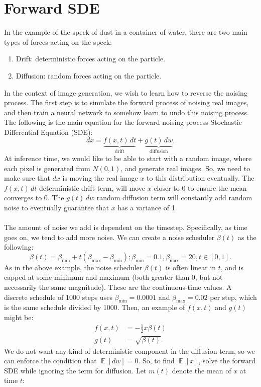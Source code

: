 \documentclass{article}
\DeclareMathOperator{\EX}{\mathbb{E}}
\begin{document}
\section{Forward SDE}
In the example of the speck of dust in a container of water, there are two main types of forces acting on the speck:
\begin{enumerate}
    \item Drift: deterministic forces acting on the particle. 
    \item Diffusion: random forces acting on the particle. 
\end{enumerate}
In the context of image generation, we wish to learn how to reverse the noising process. The first step is to simulate the forward process of noising real images, and then train a neural network to somehow learn to undo this noising process. The following is the main equation for the forward noising process Stochastic Differential Equation (SDE):
\[dx=\underbrace{f(x,t)\,dt}_{\text{drift}} + \underbrace{g(t) \,dw}_{\text{diffusion}}.\]
At inference time, we would like to be able to start with a random image, where each pixel is generated from $N(0,1)$, and generate real images. So, we need to make sure that $dx$ is moving the real image $x$ to this distribution eventually. The $f(x,t)\,dt$ deterministic drift term, will move $x$ closer to 0 to ensure the mean converges to 0. The $g(t) \,dw$ random diffusion term will constantly add random noise to eventually guarantee that $x$ has a variance of 1. 
\\
\\
The amount of noise we add is dependent on the timestep. Specifically, as time goes on, we tend to add more noise. We can create a noise scheduler $\beta(t)$ as the following:
\[\beta (t) = \beta_{\text{min}} + t(\beta_{\text{max}} - \beta_{\text{min}}); \beta_{\text{min}}=0.1, \beta_{\text{max}}=20,t\in [0,1].\]
As in the above example, the noise scheduler $\beta (t)$ is often linear in $t$, and is capped at some minimum and maximum (both greater than 0, but not necessarily the same magnitude). These are the continuous-time values. A discrete schedule of 1000 steps uses $\beta_{\text{min}}=0.0001$ and $\beta_{\text{max}}=0.02$ per step, which is the same schedule divided by 1000. Then, an example of $f(x,t)$ and $g(t)$ might be:
\begin{align*}
    f(x,t)&=-\frac{1}{2}x\beta(t)\\
    g(t)&=\sqrt{\beta(t)}.
\end{align*}
We do not want any kind of deterministic component in the diffusion term, so we can enforce the condition that $\EX[dw]=0$. So, to find $\EX[x]$, solve the forward SDE while ignoring the term for diffusion. Let $m(t)$ denote the mean of $x$ at time $t$:
\end{document}
